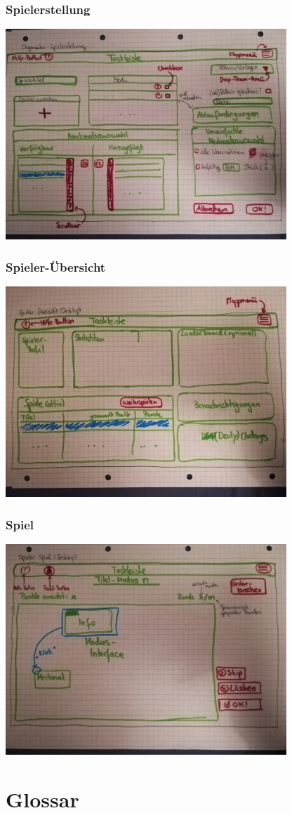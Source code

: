 \documentclass[a4paper]{scrreprt}
\begin{document}
    \subsection{Spielerstellung}
    \centering
    \includegraphics[width=400px]{../pictures/4_Spielerstellung.jpg}
    \subsection{Spieler-Übersicht}
    \label{fig:Spieler-Übersicht}
    \centering
    \includegraphics[width=400px]{../pictures/5_Spieler.jpg}
    \subsection{Spiel}
    \centering
    \includegraphics[width=400px]{../pictures/6_Spiel.jpg}
    \clearpage
    \chapter{Glossar}
    \printglossary[title=Glossar]
\end{document}
